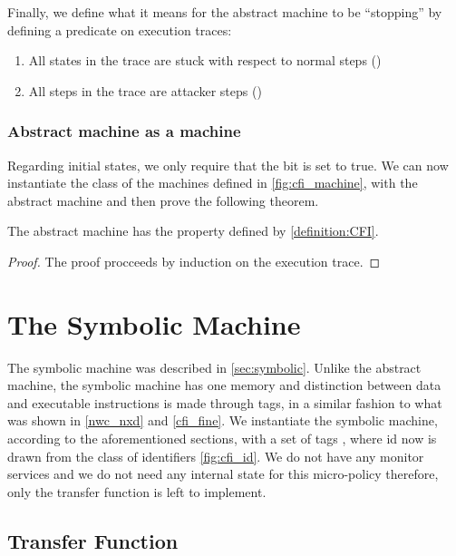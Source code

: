 Finally, we define what it means for the abstract machine to be ``stopping'' by
defining a predicate on execution traces:
\begin{enumerate}
\item All states in the trace are stuck with respect to normal steps (\stepn{}{})
\item All steps in the trace are attacker steps (\stepa{}{})
\end{enumerate}

\subsubsection{Abstract machine as a \CFI machine}\label{abstract_cfi}

Regarding initial states, we only require that the \ok bit is set to true.
We can now instantiate the class of the machines defined in 
\ref{fig:cfi_machine}, with the abstract machine and then prove the following
theorem.

\begin{thm}\label{thm:CFIabstract}
The abstract machine has the \CFI property defined by \ref{definition:CFI}.
\end{thm}

\begin{proof}
The proof procceeds by induction on the execution trace.
\end{proof}


\section{The Symbolic  Machine}\label{sec:symbolic_cfi}

The symbolic machine was described in \ref{sec:symbolic}. Unlike the abstract
machine, the symbolic machine has one memory and distinction between data
and executable instructions is made through tags, in a similar fashion to what
was shown in \ref{nwc_nxd} and \ref{cfi_fine}. We instantiate the symbolic
machine, according to the aforementioned sections, with a set of tags
, where id now is drawn from the class
of identifiers \ref{fig:cfi_id}. We do not have any monitor services and
we do not need any internal state for this micro-policy therefore, only the
transfer function is left to implement.

\subsection{Transfer Function}\label{sec:transfer_fun}

